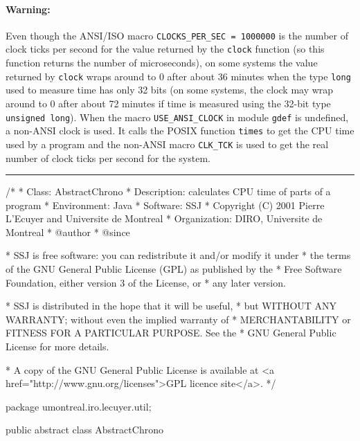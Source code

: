 \begin{latexonly}
\begin{hide}  %
\paragraph{Warning:}
  Even though the ANSI/ISO macro \texttt{CLOCKS\_PER\_SEC = 1000000}
  is the number of clock ticks per second for the value
  returned by the \texttt{clock} function (so this function returns the
  number of microseconds), on some systems the value returned by \texttt{clock}
  wraps around to 0 after about 36 minutes when the type \texttt{long}
  used to measure time has only 32 bits (on some systems, the clock may
  wrap around to 0 after about 72 minutes if time is
  measured using the 32-bit type \texttt{unsigned long}).
  When the macro \texttt{USE\_ANSI\_CLOCK} in module \texttt{gdef} is undefined,
  a non-ANSI clock is used. It calls the POSIX function
  \texttt{times} to get the CPU time used by a program and the
  non-ANSI macro \texttt{CLK\_TCK} is used to get the real number of
  clock ticks per second for the system.
\end{hide}   %

\end{latexonly}

\bigskip\hrule\bigskip
\begin{code}
\begin{hide}
/*
 * Class:        AbstractChrono
 * Description:  calculates CPU time of parts of a program
 * Environment:  Java
 * Software:     SSJ 
 * Copyright (C) 2001  Pierre L'Ecuyer and Universite de Montreal
 * Organization: DIRO, Universite de Montreal
 * @author       
 * @since

 * SSJ is free software: you can redistribute it and/or modify it under
 * the terms of the GNU General Public License (GPL) as published by the
 * Free Software Foundation, either version 3 of the License, or
 * any later version.

 * SSJ is distributed in the hope that it will be useful,
 * but WITHOUT ANY WARRANTY; without even the implied warranty of
 * MERCHANTABILITY or FITNESS FOR A PARTICULAR PURPOSE.  See the
 * GNU General Public License for more details.

 * A copy of the GNU General Public License is available at
   <a href="http://www.gnu.org/licenses">GPL licence site</a>.
 */
\end{hide}
package umontreal.iro.lecuyer.util;


public abstract class AbstractChrono\begin{hide} {

   private long m_second;
   private long m_microsec;
   private long[] now = new long[2];
   // tab[0] = seconds, tab[1] = microseconds

   protected abstract void getTime (long[] tab);
\end{hide}
\end{code}

